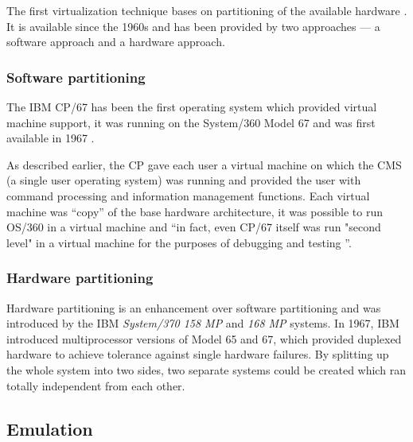 The first virtualization technique  bases on partitioning of the available
hardware \cite{borden89}.   It is available  since the 1960s and  has been
provided  by  two  approaches  ---  a software  approach  and  a  hardware
approach.

\subsubsection{Software partitioning}
\label{sec:softw-part}

The IBM CP/67  has been the first operating  system which provided virtual
machine support, it  was running on the System/360 Model  67 and was first
available in 1967 \cite{borden89}.

As described earlier, the CP gave each user a virtual machine on which the
CMS (a  single user  operating system) was  running and provided  the user
with command processing and information management functions. Each virtual
machine was ``copy'' of the base hardware architecture, it was possible to
run OS/360 in  a virtual machine and ``in fact, even  CP/67 itself was run
"second  level" in a  virtual machine  for the  purposes of  debugging and
testing \cite{borden89}''.

\subsubsection{Hardware partitioning}
\label{sec:hardw-part}

Hardware partitioning is an enhancement over software partitioning and was
introduced  by  the  IBM   \emph{System/370  158  MP}  and  \emph{168  MP}
systems. In 1967,  IBM introduced multiprocessor versions of  Model 65 and
67, which  provided duplexed hardware to achieve  tolerance against single
hardware failures.  By  splitting up the whole system  into two sides, two
separate systems could be created  which ran totally independent from each
other.

\subsection{Emulation}
\label{sec:emulation}

